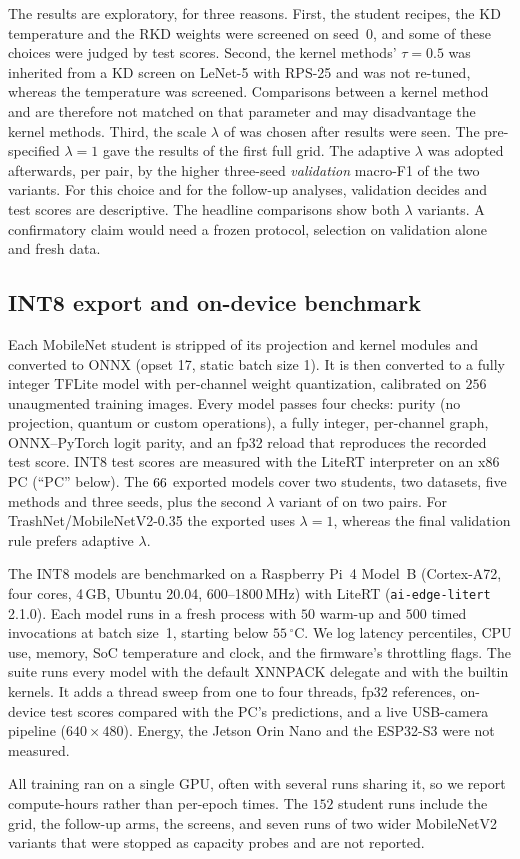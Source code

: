 The results are exploratory, for three reasons.
First, the student recipes, the KD temperature and the RKD weights were screened on seed~0, and some of these choices were judged by test scores.
Second, the kernel methods' $\tau=0.5$ was inherited from a KD screen on LeNet-5 with RPS-25 and was not re-tuned, whereas the \Kd temperature was screened. Comparisons between a kernel method and \Kd are therefore not matched on that parameter and may disadvantage the kernel methods.
Third, the scale $\lambda$ of \Pqk was chosen after results were seen. The pre-specified $\lambda=1$ gave the \Pqk results of the first full grid. The adaptive $\lambda$ was adopted afterwards, per pair, by the higher three-seed \emph{validation} macro-F1 of the two variants.
For this choice and for the follow-up analyses, validation decides and test scores are descriptive. The headline comparisons show both $\lambda$ variants.
A confirmatory claim would need a frozen protocol, selection on validation alone and fresh data.

\subsection{INT8 export and on-device benchmark}
\label{sec:setup-int8}

Each MobileNet student is stripped of its projection and kernel modules and converted to ONNX (opset 17, static batch size 1). It is then converted to a fully integer TFLite model with per-channel weight quantization, calibrated on $256$ unaugmented training images.
Every model passes four checks: purity (no projection, quantum or custom operations), a fully integer, per-channel graph, ONNX--PyTorch logit parity, and an fp32 reload that reproduces the recorded test score.
INT8 test scores are measured with the LiteRT interpreter on an x86 PC (``PC'' below).
The $66{}$ exported models cover two students, two datasets, five methods and three seeds, plus the second $\lambda$ variant of \Pqk on two pairs. For TrashNet/MobileNetV2-0.35 the exported \Pqk uses $\lambda=1$, whereas the final validation rule prefers adaptive $\lambda$.

The INT8 models are benchmarked on a Raspberry Pi~4 Model~B (Cortex-A72, four cores, 4\,GB, Ubuntu 20.04, 600--1800\,MHz) with LiteRT (\texttt{ai-edge-litert} 2.1.0).
Each model runs in a fresh process with $50$ warm-up and $500$ timed invocations at batch size~1, starting below $55\,^\circ$C. We log latency percentiles, CPU use, memory, SoC temperature and clock, and the firmware's throttling flags.
The suite runs every model with the default XNNPACK delegate and with the builtin kernels. It adds a thread sweep from one to four threads, fp32 references, on-device test scores compared with the PC's predictions, and a live USB-camera pipeline ($640{\times}480$).
Energy, the Jetson Orin Nano and the ESP32-S3 were not measured.

All training ran on a single GPU, often with several runs sharing it, so we report compute-hours rather than per-epoch times.
The $152$ student runs include the grid, the follow-up arms, the screens, and seven runs of two wider MobileNetV2 variants that were stopped as capacity probes and are not reported.
